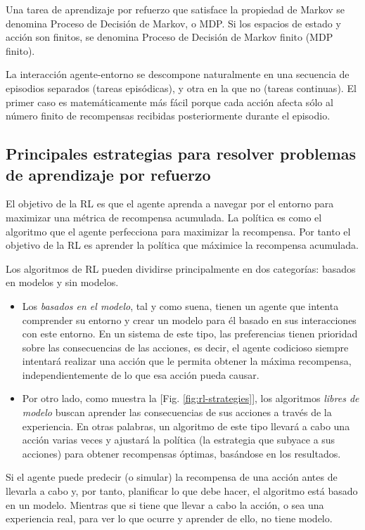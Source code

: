 Una tarea de aprendizaje por refuerzo que satisface la propiedad de Markov se denomina Proceso de Decisión de Markov, o MDP. Si los espacios de estado y acción son finitos, se denomina Proceso de Decisión de Markov finito (MDP finito).

La interacción agente-entorno se descompone naturalmente en una secuencia de episodios separados (tareas episódicas), y otra en la que no (tareas continuas). El primer caso es matemáticamente más fácil porque cada acción afecta sólo al número finito de recompensas recibidas posteriormente durante el episodio.

\subsection*{Principales estrategias para resolver problemas de aprendizaje por refuerzo}

El objetivo de la RL es que el agente aprenda a navegar por el entorno para maximizar una métrica de recompensa acumulada. La política es como el algoritmo que el agente perfecciona para maximizar la recompensa. Por tanto el objetivo de la RL es aprender la política que máximice la recompensa acumulada.

Los algoritmos de RL pueden dividirse principalmente en dos categorías: basados en modelos y sin modelos.

\begin{itemize}
\item Los \textit{basados en el modelo}, tal y como suena, tienen un agente que intenta comprender su entorno y crear un modelo para él basado en sus interacciones con este entorno. En un sistema de este tipo, las preferencias tienen prioridad sobre las consecuencias de las acciones, es decir, el agente codicioso siempre intentará realizar una acción que le permita obtener la máxima recompensa, independientemente de lo que esa acción pueda causar.

\item Por otro lado, como muestra la [Fig. \ref{fig:rl-strategies}], los algoritmos \textit{libres de modelo} buscan aprender las consecuencias de sus acciones a través de la experiencia. En otras palabras, un algoritmo de este tipo llevará a cabo una acción varias veces y ajustará la política (la estrategia que subyace a sus acciones) para obtener recompensas óptimas, basándose en los resultados.
\end{itemize}

Si el agente puede predecir (o simular) la recompensa de una acción antes de llevarla a cabo y, por tanto, planificar lo que debe hacer, el algoritmo está basado en un modelo. Mientras que si tiene que llevar a cabo la acción, o sea una experiencia real, para ver lo que ocurre y aprender de ello, no tiene modelo.


